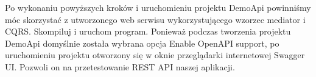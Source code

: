 Po wykonaniu powyższych kroków i uruchomieniu projektu DemoApi powinniśmy móc skorzystać z utworzonego web serwisu wykorzystującego wzorzec mediator i CQRS. Skompiluj i uruchom program. Ponieważ podczas tworzenia projektu DemoApi domyślnie została wybrana opcja Enable OpenAPI support, po uruchomieniu projektu otworzony się w oknie przeglądarki internetowej Swagger UI. Pozwoli on na przetestowanie REST API naszej aplikacji.